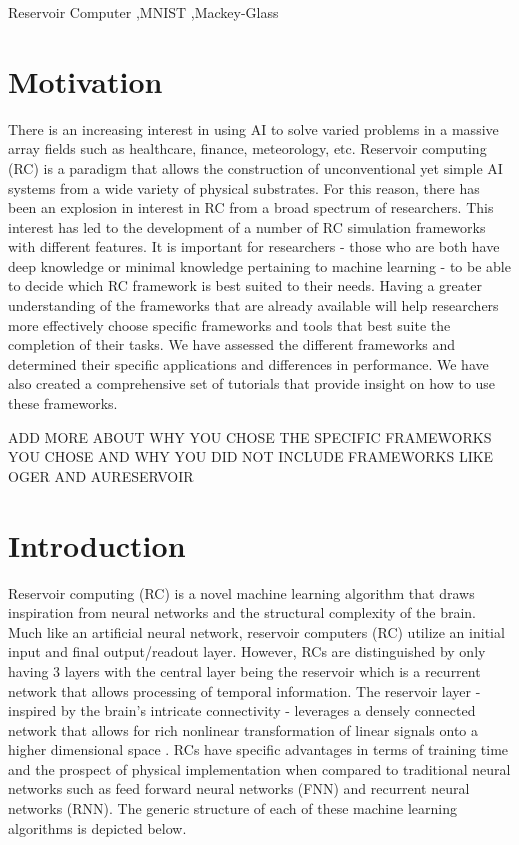 \documentclass[a4paper,fleqn]{cas-dc}
\begin{document}
\begin{keywords}
Reservoir Computer \sep MNIST \sep Mackey-Glass
\end{keywords}

\maketitle


\section{Motivation}
There is an increasing interest in using AI to solve varied problems in a massive array fields such as healthcare, finance, meteorology, etc. Reservoir computing (RC) is a paradigm that allows the construction of unconventional yet simple AI systems from a wide variety of physical substrates. For this reason, there has been an explosion in interest in RC from a broad spectrum of researchers. This interest has led to the development of a number of RC simulation frameworks with different features. It is important for researchers - those who are both have deep knowledge or minimal knowledge pertaining to machine learning -  to be able to decide which RC framework is best suited to their needs. Having a greater understanding of the frameworks that are already available will help researchers more effectively choose specific frameworks and tools that best suite the completion of their tasks. We have assessed the different frameworks and determined their specific applications and differences in performance. We have also created a comprehensive set of tutorials that provide insight on how to use these frameworks. 

ADD MORE ABOUT WHY YOU CHOSE THE SPECIFIC FRAMEWORKS YOU CHOSE AND WHY YOU DID NOT INCLUDE FRAMEWORKS LIKE OGER AND AURESERVOIR

\section{Introduction}
Reservoir computing (RC) is a novel machine learning algorithm that draws inspiration from neural networks and the structural complexity of the brain. Much like an artificial neural network, reservoir computers (RC) utilize an initial input and final output/readout layer. However, RCs are distinguished by only having 3 layers with the central layer being the reservoir which is a recurrent network that allows processing of temporal information. The reservoir layer - inspired by the brain's intricate connectivity - leverages a densely connected network that allows for rich nonlinear transformation of linear signals onto a higher dimensional space \citep{cucchi_hands-reservoir_2022}. RCs have specific advantages in terms of training time and the prospect of physical implementation when compared to traditional neural networks such as feed forward neural networks (FNN) and recurrent neural networks (RNN). The generic structure of each of these machine learning algorithms is depicted below.
\end{document}
